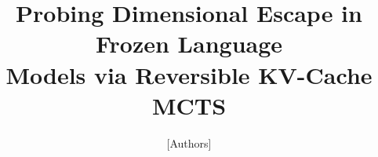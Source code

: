 \documentclass[11pt]{article}
\title{Probing Dimensional Escape in Frozen Language \\ Models via Reversible KV-Cache MCTS}
\author{[Authors]}
\date{}
\begin{document}
\maketitle

\begin{abstract}

\end{abstract}











\end{document}
